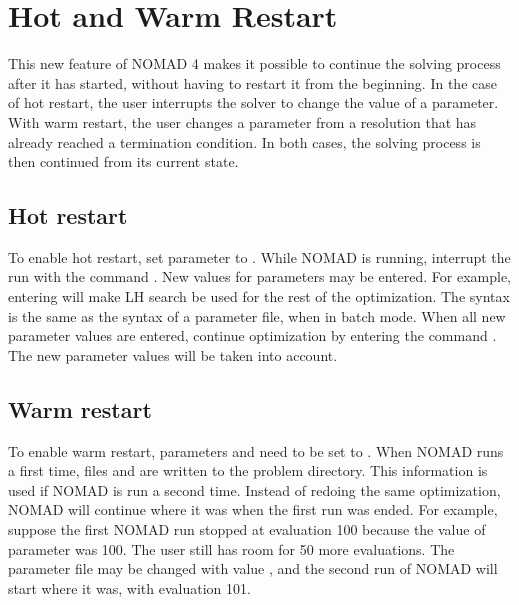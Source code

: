 \documentclass[letterpaper,10pt,english]{sphinxmanual}
\begin{document}
\section{Hot and Warm Restart}
\label{\detokenize{AdvancedFunctionalities:hot-and-warm-restart}}\label{\detokenize{AdvancedFunctionalities:hot-restart}}
\sphinxAtStartPar
This new feature of NOMAD 4 makes it possible to continue the solving process after it has started,
without having to restart it from the beginning.
In the case of hot restart, the user interrupts the solver to change the value of a parameter.
With warm restart, the user changes a parameter from a resolution that has already reached a termination condition.
In both cases, the solving process is then continued from its current state.


\subsection{Hot restart}
\label{\detokenize{AdvancedFunctionalities:id17}}
\sphinxAtStartPar
To enable hot restart, set parameter  to .
While NOMAD is running, interrupt the run with the command .
New values for parameters may be entered.
For example, entering  will make LH search be used for the rest of the optimization.
The syntax is the same as the syntax of a parameter file, when in batch mode.
When all new parameter values are entered, continue optimization by entering
the command . The new parameter values will be taken into account.


\subsection{Warm restart}
\label{\detokenize{AdvancedFunctionalities:warm-restart}}
\sphinxAtStartPar
To enable warm restart, parameters  and  need to be set to .
When NOMAD runs a first time, files  and  are written to the problem directory.
This information is used if NOMAD is run a second time.
Instead of redoing the same optimization, NOMAD will continue where it was when the first run was ended.
For example, suppose the first NOMAD run stopped at evaluation 100 because the value of parameter  was 100.
The user still has room for 50 more evaluations.
The parameter file may be changed with value , and the second run of
NOMAD will start where it was, with evaluation 101.
\end{document}

